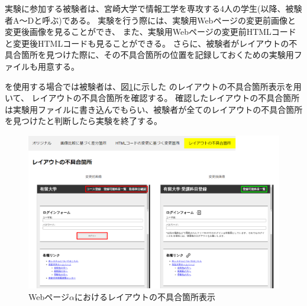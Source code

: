 実験に参加する被験者は、宮崎大学で情報工学を専攻する4人の学生(以降、被験者A～Dと呼ぶ)である。
実験を行う際には、実験用Webページの変更前画像と変更後画像を見ることができ、
また、実験用Webページの変更前HTMLコードと変更後HTMLコードも見ることができる。
さらに、被験者がレイアウトの不具合箇所を見つけた際に、その不具合箇所の位置を記録しておくための実験用ファイルも用意する。
\par
\toolName を使用する場合では被験者は、図\ref{fig:test1_subeffect}に示した
\toolName のレイアウトの不具合箇所表示を用いて、
レイアウトの不具合箇所を確認する。
確認したレイアウトの不具合箇所は実験用ファイルに書き込んでもらい、被験者が全てのレイアウトの不具合箇所を見つけたと判断したら実験を終了する。
\begin{figure}[tp]
    \centering
    \includegraphics[width=1.0\textwidth]{image/5/new_effect.png}
    \caption{Webページ$\alpha$におけるレイアウトの不具合箇所表示}
    \label{fig:test1_subeffect}
\end{figure}

